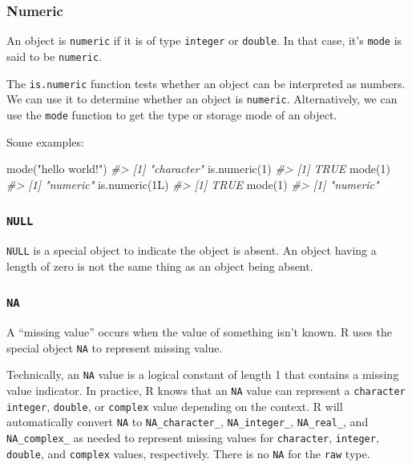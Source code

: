 \documentclass[
]{article}
\newenvironment{Shaded}{\begin{snugshade}}{\end{snugshade}}
\newcommand{\CommentTok}[1]{\textcolor[rgb]{0.56,0.35,0.01}{\textit{#1}}}
\newcommand{\DecValTok}[1]{\textcolor[rgb]{0.00,0.00,0.81}{#1}}
\newcommand{\FunctionTok}[1]{\textcolor[rgb]{0.00,0.00,0.00}{#1}}
\newcommand{\NormalTok}[1]{#1}
\newcommand{\StringTok}[1]{\textcolor[rgb]{0.31,0.60,0.02}{#1}}
\begin{document}
\hypertarget{numeric}{%
\subsubsection{Numeric}\label{numeric}}

An object is \texttt{numeric} if it is of type \texttt{integer} or
\texttt{double}. In that case, it's \texttt{mode} is said to be
\texttt{numeric}.

The \texttt{is.numeric} function tests whether an object can be
interpreted as numbers. We can use it to determine whether an object is
\texttt{numeric}. Alternatively, we can use the \texttt{mode} function
to get the type or storage mode of an object.

Some examples:

\begin{Shaded}
\begin{Highlighting}[]
\FunctionTok{mode}\NormalTok{(}\StringTok{"hello world!"}\NormalTok{)}
\CommentTok{\#\textgreater{} [1] "character"}
\FunctionTok{is.numeric}\NormalTok{(}\DecValTok{1}\NormalTok{)}
\CommentTok{\#\textgreater{} [1] TRUE}
\FunctionTok{mode}\NormalTok{(}\DecValTok{1}\NormalTok{)}
\CommentTok{\#\textgreater{} [1] "numeric"}
\FunctionTok{is.numeric}\NormalTok{(1L)}
\CommentTok{\#\textgreater{} [1] TRUE}
\FunctionTok{mode}\NormalTok{(}\DecValTok{1}\NormalTok{)}
\CommentTok{\#\textgreater{} [1] "numeric"}
\end{Highlighting}
\end{Shaded}

\hypertarget{null}{%
\subsubsection{\texorpdfstring{\texttt{NULL}}{NULL}}\label{null}}

\texttt{NULL} is a special object to indicate the object is absent. An
object having a length of zero is not the same thing as an object being
absent.

\hypertarget{na}{%
\subsubsection{\texorpdfstring{\texttt{NA}}{NA}}\label{na}}

A ``missing value'' occurs when the value of something isn't known. R
uses the special object \texttt{NA} to represent missing value.

Technically, an \texttt{NA} value is a logical constant of length 1 that
contains a missing value indicator. In practice, R knows that an
\texttt{NA} value can represent a \texttt{character} \texttt{integer},
\texttt{double}, or \texttt{complex} value depending on the context. R
will automatically convert \texttt{NA} to \texttt{NA\_character\_},
\texttt{NA\_integer\_}, \texttt{NA\_real\_}, and \texttt{NA\_complex\_}
as needed to represent missing values for \texttt{character},
\texttt{integer}, \texttt{double}, and \texttt{complex} values,
respectively. There is no \texttt{NA} for the \texttt{raw} type.
\end{document}

